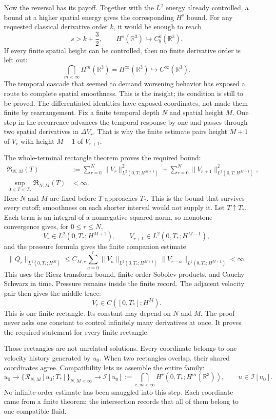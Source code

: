 Now the reversal has its payoff.  Together with the \(L^2\) energy already
controlled, a bound at a higher spatial energy gives the corresponding
\(H^s\) bound.  For any requested classical derivative order \(k\), it would
be enough to reach
\[
s>k+\frac32,
\qquad
H^s(\mathbb R^3)\hookrightarrow C_b^k(\mathbb R^3).
\]
If every finite spatial height can be controlled, then no finite derivative
order is left out:
\[
\bigcap_{m<\infty}H^m(\mathbb R^3)
=H^\infty(\mathbb R^3)
\hookrightarrow C^\infty(\mathbb R^3).
\]
The temporal cascade that seemed to demand worsening behavior has exposed a
route to complete spatial smoothness.  This is the insight; its condition is
still to be proved.  The differentiated identities have exposed coordinates,
not made them finite by rearrangement.  Fix a finite
temporal depth \(N\) and spatial height \(M\).  One step in the recurrence
advances the temporal response by one and passes through two spatial derivatives
in \(\Delta V_r\).  That is why the finite estimate pairs height \(M+1\)
of \(V_r\) with height \(M-1\) of \(V_{r+1}\).

The whole-terminal rectangle theorem proves the required bound:
\[
\begin{aligned}
\mathfrak R_{N,M}(T)
&:=\sum_{r=0}^{N}
\|V_r\|_{L^2(0,T;H^{M+1})}^{2}+
\sum_{r=0}^{N}
\|V_{r+1}\|_{L^2(0,T;H^{M-1})}^{2},\\
\sup_{0<T<T_*}\mathfrak R_{N,M}(T)&<\infty.
\end{aligned}
\]
Here \(N\) and \(M\) are fixed before \(T\) approaches \(T_*\).  This is
the bound that survives every cutoff; smoothness on each shorter interval
would not supply it.  Let \(T\uparrow T_*\).  Each term is an integral of a
nonnegative squared norm, so monotone convergence gives, for
\(0\le r\le N\),
\[
V_r\in L^2(0,T_*;H^{M+1}),
\qquad
V_{r+1}\in L^2(0,T_*;H^{M-1}),
\]
and the pressure formula gives the finite companion estimate
\[
\|Q_r\|_{L^1(0,T_*;H^M)}
\leq C_{M,r}\sum_{a=0}^{r}
\|V_a\|_{L^2(0,T_*;H^{M+1})}
\|V_{r-a}\|_{L^2(0,T_*;H^{M+1})}<\infty.
\]
This uses the Riesz-transform bound, finite-order Sobolev products, and
Cauchy--Schwarz in time.  Pressure remains inside the finite record.
The adjacent velocity pair then gives the middle trace:
\[
V_r\in C([0,T_*];H^M).
\]
This is one finite rectangle.  Its constant may depend on \(N\) and \(M\).
The proof never asks one constant to control infinitely many derivatives at
once.  It proves the required statement for every finite rectangle.

Those rectangles are not unrelated solutions.  Every coordinate belongs to
one velocity history generated by \(u_0\).  When two rectangles overlap, their
shared coordinates agree.  Compatibility lets us assemble the entire family:
\[
u_0
\longrightarrow
\{\mathcal R_{N,M}[u_0;T_*]\}_{N,M<\infty}
\longrightarrow
\mathcal I[u_0]
:=\bigcap_{r,m<\infty}H^r(0,T_*;H^m(\mathbb R^3)),
\qquad
u\in\mathcal I[u_0].
\]
No infinite-order estimate has been smuggled into this step.  Each coordinate
came from a finite theorem; the intersection records that all of them belong
to one compatible fluid.

